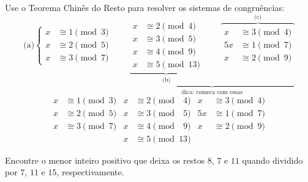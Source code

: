 \begin{homework}
    Use o Teorema Chinês do Resto para resolver os sistemas de congruências:
    $$
    \text{(a)}
    \left\{
            \begin{aligned}
                x&\cong 1\pmod 3\\
                x&\cong 2\pmod 5\\
                x&\cong 3\pmod 7
            \end{aligned}
    \right.
    \qquad
    \underbrace{
    \underbrace{
            \begin{aligned} %
                x&\cong 2\pmod 4\\
                x&\cong 3\pmod 5\\
                x&\cong 4\pmod 9\\
                x&\cong 5\pmod {13}
            \end{aligned}
        }_{\text{(b)}}
    \qquad
    \overbrace{
            \begin{aligned}
                x&\cong 3\pmod 4\\
               5x&\cong 1\pmod 7\\
                x&\cong 2\pmod 9
            \end{aligned}
        }^{\text{(c)}} %
    }_{\text{dica: comeca com essas}}
    $$
    \begin{align*}
        x&\cong 1\pmod 3 &    x&\cong 2\pmod {\phantom04}  &   x&\cong 3\pmod 4\\
        x&\cong 2\pmod 5 &    x&\cong 3\pmod {\phantom05}  &  5x&\cong 1\pmod 7\\
        x&\cong 3\pmod 7 &    x&\cong 4\pmod {\phantom09}  &   x&\cong 2\pmod 9\\
         &               &    x&\cong 5\pmod {13} 
    \end{align*}
\end{homework}

\begin{homework}
    Encontre o menor inteiro positivo que deixa os restos $8$, $7$ e $11$ quando dividido por $7$, $11$ e $15$, respectivamente.
\end{homework}
